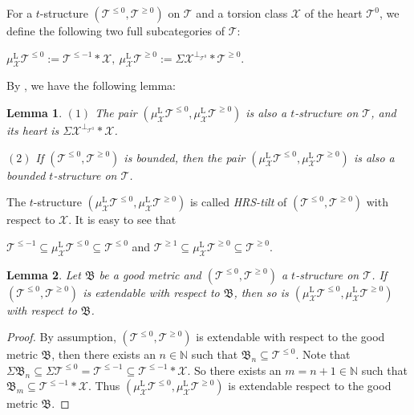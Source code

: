 \documentclass[11pt,a4paper]{amsart}
\numberwithin{equation}{section} \theoremstyle{plain}
\newtheorem{lem}{Lemma}[section]
\numberwithin{equation}{section} \theoremstyle{definition}
\begin{document}
For a $t$-structure $(\mathcal{T}^{\leq0},\mathcal{T}^{\geq0})$ on $\mathcal{T}$ and a torsion class $\mathcal{X}$ of the heart $\mathcal{T}^{0}$, we define the following two full subcategories of $\mathcal{T}$:
\begin{center}
$\mu^{\mathrm{L}}_{\mathcal{X}}\mathcal{T}^{\leq0}:=\mathcal{T}^{\leq-1}*\mathcal{X},~\mu^{\mathrm{L}}_{\mathcal{X}}\mathcal{T}^{\geq0}:=\Sigma\mathcal{X}^{\perp_{\mathcal{T}^{0}}}*\mathcal{T}^{\geq0}$.
\end{center}
By \cite[Chapter 1, Proposition 2.1]{HRS}, we have the following lemma:

\begin{lem} $(1)$ The pair $(\mu^{\mathrm{L}}_{\mathcal{X}}\mathcal{T}^{\leq0},\mu^{\mathrm{L}}_{\mathcal{X}}\mathcal{T}^{\geq0})$ is also a  $t$-structure on $\mathcal{T}$, and its heart is $\Sigma\mathcal{X}^{\perp_{\mathcal{T}^{0}}}*\mathcal{X}$.


$(2)$ If $(\mathcal{T}^{\leq0},\mathcal{T}^{\geq0})$ is bounded, then the pair $(\mu^{\mathrm{L}}_{\mathcal{X}}\mathcal{T}^{\leq0},\mu^{\mathrm{L}}_{\mathcal{X}}\mathcal{T}^{\geq0})$ is also a bounded $t$-structure on $\mathcal{T}$.
\end{lem}


The $t$-structure $(\mu^{\mathrm{L}}_{\mathcal{X}}\mathcal{T}^{\leq0},\mu^{\mathrm{L}}_{\mathcal{X}}\mathcal{T}^{\geq0})$ is called \emph{HRS-tilt} of $(\mathcal{T}^{\leq0},\mathcal{T}^{\geq0})$ with respect to $\mathcal{X}$. It is easy to see that
\begin{center}
$\mathcal{T}^{\leq-1}\subseteq\mu^{\mathrm{L}}_{\mathcal{X}}\mathcal{T}^{\leq0}\subseteq\mathcal{T}^{\leq0}$ and $\mathcal{T}^{\geq1}\subseteq\mu^{\mathrm{L}}_{\mathcal{X}}\mathcal{T}^{\geq0}\subseteq\mathcal{T}^{\geq0}$.
\end{center}


\begin{lem}\label{lem2} Let $\mathfrak{B}$ be a good metric and $(\mathcal{T}^{\leq0},\mathcal{T}^{\geq0})$ a $t$-structure on $\mathcal{T}$. If $(\mathcal{T}^{\leq0},\mathcal{T}^{\geq0})$ is extendable with respect to $\mathfrak{B}$, then so is $(\mu^{\mathrm{L}}_{\mathcal{X}}\mathcal{T}^{\leq0},\mu^{\mathrm{L}}_{\mathcal{X}}\mathcal{T}^{\geq0})$ with respect to $\mathfrak{B}$.
\end{lem}
\begin{proof} By assumption, $(\mathcal{T}^{\leq0},\mathcal{T}^{\geq0})$ is extendable with respect to the good metric $\mathfrak{B}$, then there exists an $n\in\mathbb{N}$ such that $\mathfrak{B}_{n}\subseteq\mathcal{T}^{\leq0}$. Note that $\Sigma\mathfrak{B}_{n}\subseteq\Sigma\mathcal{T}^{\leq0}=\mathcal{T}^{\leq-1}\subseteq\mathcal{T}^{\leq-1}*\mathcal{X}$. So there exists an $m=n+1\in\mathbb{N}$ such that $\mathfrak{B}_{m}\subseteq\mathcal{T}^{\leq-1}*\mathcal{X}$. Thus $(\mu^{\mathrm{L}}_{\mathcal{X}}\mathcal{T}^{\leq0},\mu^{\mathrm{L}}_{\mathcal{X}}\mathcal{T}^{\geq0})$ is extendable respect to the good metric $\mathfrak{B}$.
\end{proof}
\end{document}
